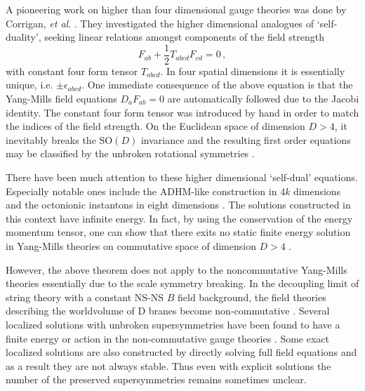 \documentclass[a4paper,11pt]{article}
\begin{document}
A pioneering work on higher  than four dimensional gauge theories was done by Corrigan, \textit{et al}. \cite{cdfn}. They investigated the higher
dimensional analogues of `self-duality', seeking linear relations amongst components of the field strength
\begin{equation}
F_{ab}+\frac{1}{2}T_{abcd}F_{cd}=0\,, \label{BPS}
\end{equation}
with constant four form tensor $T_{abcd}$. In four spatial dimensions it is essentially unique, i.e. $\pm\epsilon_{abcd}$. One immediate consequence
of the above equation is that the Yang-Mills field equations $D_{a}F_{ab}=0$ are automatically followed due to the Jacobi identity. The constant
four form tensor was introduced by hand in order to match the indices of the field strength. On the Euclidean space of dimension $D>4$, it inevitably
breaks the $\mbox{SO}(D)$ invariance and the resulting first order equations may be classified by the unbroken rotational symmetries
\cite{cdfn,ward}.



There have been much attention  to these higher dimensional `self-dual' equations. Especially notable ones include the
ADHM-like construction in $4k$ dimensions \cite{4kADHM} and the octonionic instantons in eight dimensions
\cite{fubini,harveystrominger}. The solutions constructed in this context have infinite energy. In fact, by using the
conservation of the energy momentum tensor, one can show that there exits no static finite energy solution
 in Yang-Mills theories on commutative space of  dimension $D>4$ \cite{jaffe}.



However, the above theorem does not apply to the noncommutative Yang-Mills  theories    essentially due to the scale symmetry breaking. In the
decoupling limit of string theory with a constant NS-NS $B$ field background, the field theories describing the worldvolume of D branes become
non-commutative \cite{non-comm}. Several localized  solutions with unbroken  supersymmetries have been found to have a finite energy or action in
the non-commutative gauge theories \cite{shift,witten,kraus}. Some exact localized solutions are also constructed by directly solving full field
equations \cite{kraus,park,aganagic,harvey} and as a result  they are not always stable. Thus even with explicit solutions the number of the
preserved supersymmetries remains sometimes unclear.
\end{document}
